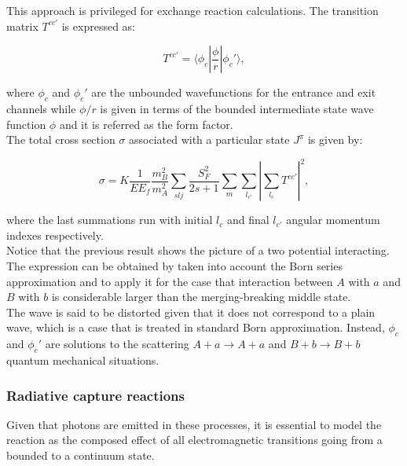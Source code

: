 \documentclass[openany]{book}
\begin{document}
This approach is privileged for exchange reaction calculations. The transition matrix $T^{cc'}$ is expressed as: 

\begin{equation}\label{eq:exchange_matrix}
	T^{cc'} = \langle  \phi_c | \frac{\phi}{r}|  \phi_c' \rangle,
\end{equation}

where $\phi_c $ and $\phi_c'$ are the unbounded wavefunctions for the entrance and exit channels while $\phi/r$ is given in terms of the bounded intermediate state wave function $\phi$ and it is referred as the form factor. \\

The total cross section $\sigma$ associated with a particular state $J^{\pi}$ is given by: 

\begin{equation} \label{eq:exchange_crossSection}
	\sigma = K \frac{1}{E E_f} \frac{m^2_B}{m^2_A} \sum_{slj} { \frac{S^2_F}{2s + 1}\sum_{m} \sum_{l_{c'}} \left|\sum_{l_{c}} T^{cc'}\right|^2},
\end{equation}

where the last summations run with initial $l_{c}$ and final $l_{c'}$ angular momentum indexes respectively. \\

Notice that the previous result shows the picture of a two potential interacting. The expression can be obtained by taken into account the Born series approximation and to apply it for the case that interaction between $A$ with $a$ and $B$ with $b$ is considerable larger than the merging-breaking middle state. \\

The wave is said to be distorted given that it does not correspond to a plain wave, which is a case that is treated in standard Born approximation. Instead,  $\phi_c $ and $\phi_c'$ are solutions to the scattering $A + a \rightarrow A + a$ and $B + b \rightarrow B + b$ quantum mechanical situations. \\
 
\subsubsection{Radiative capture reactions}   \label{ssub:potential_calculations_radiativeCapture}

Given that photons are emitted in these processes, it is essential to model the reaction as the composed effect of  all electromagnetic transitions going from a bounded to a continuum state.  \\
\end{document}
